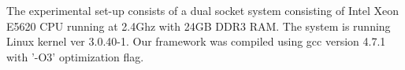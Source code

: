 The experimental set-up consists of a dual socket system consisting of
Intel Xeon E5620 CPU running at 2.4Ghz with 24GB DDR3 RAM. The system
is running Linux kernel ver 3.0.40-1. Our framework was compiled
using gcc version 4.7.1 with '-O3' optimization flag.




